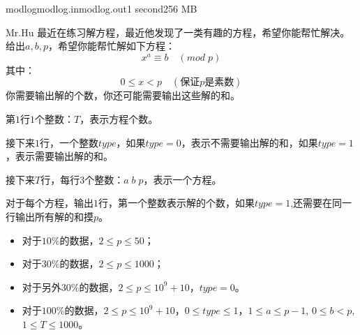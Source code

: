 \documentclass[11pt,a4paper,oneside]{article}
\begin{document}
\begin{problem}{modlog}{modlog.in}{modlog.out}{1 second}{256 MB}
	
	Mr.Hu 最近在练习解方程，最近他发现了一类有趣的方程，希望你能帮忙解决。
	给出$a,b,p$，希望你能帮忙解如下方程：
	$$
		x^a \equiv b \quad (mod \; p)
	$$
	其中：
	$$
		0 \leq x < p \quad(\textbf{保证$p$是素数})
	$$
	你需要输出解的个数，你还可能需要输出这些解的和。
	
	\InputFile
	第$1$行$1$个整数：$T$，表示方程个数。
	
	接下来$1$行，一个整数$type$，如果$type = 0$，表示不需要输出解的和，如果$type = 1$，表示需要输出解的和。
	
	接下来$T$行，每行$3$个整数：$a \; b \; p$，表示一个方程。
	
	\OutputFile
	对于每个方程，输出$1$行，第一个整数表示解的个数，如果$type = 1$,还需要在同一行输出所有解的和摸$p$。
	
	\Example
	
	\begin{example}
	\end{example}
	
	\begin{example}
		\exmp{
			2
			0
			1 3 5
			2 4 7
		}{
			1
			2
		}%
	\end{example}
	
	\Note
	\begin{itemize}
		\item 对于$10\%$的数据，$2 \leq p \leq 50$；
		\item 对于$30\%$的数据，$2 \leq p \leq 1000$；
		\item 对于另外$30\%$的数据，$2 \leq p \leq 10^9 + 10$，$type = 0$。
		\item 对于$100\%$的数据，$2 \leq p \leq 10^9 + 10$，$0 \leq type \leq 1$，$1 \leq a \leq p - 1$, $0 \leq b < p$, $1 \leq T \leq 1000$。
	\end{itemize}

\end{problem}
\end{document}
